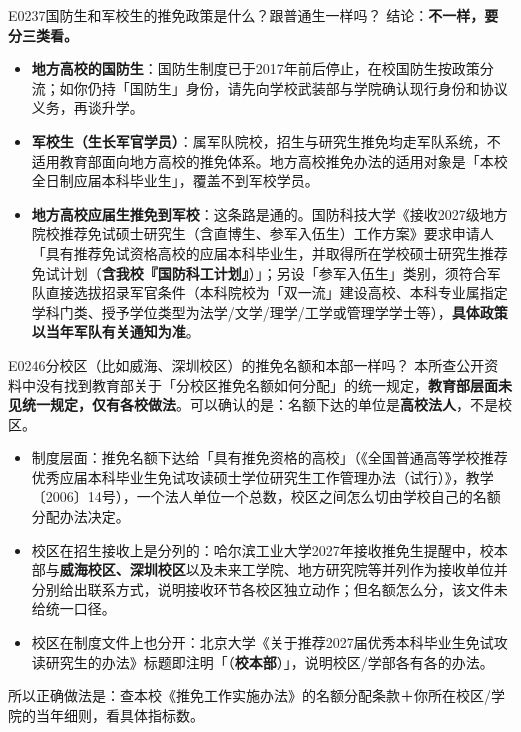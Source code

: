 \begin{qa}{E0237}{国防生和军校生的推免政策是什么？跟普通生一样吗？}
结论：\textbf{不一样，要分三类看。}
\begin{itemize}
  \item \textbf{地方高校的国防生}：国防生制度已于2017年前后停止，在校国防生按政策分流；如你仍持「国防生」身份，请先向学校武装部与学院确认现行身份和协议义务，再谈升学。
  \item \textbf{军校生（生长军官学员）}：属军队院校，招生与研究生推免均走军队系统，不适用教育部面向地方高校的推免体系。地方高校推免办法的适用对象是「本校全日制应届本科毕业生」，覆盖不到军校学员。
  \item \textbf{地方高校应届生推免到军校}：这条路是通的。国防科技大学《接收2027级地方院校推荐免试硕士研究生（含直博生、参军入伍生）工作方案》要求申请人「具有推荐免试资格高校的应届本科毕业生，并取得所在学校硕士研究生推荐免试计划（\textbf{含我校『国防科工计划』}）」；另设「参军入伍生」类别，须符合军队直接选拔招录军官条件（本科院校为「双一流」建设高校、本科专业属指定学科门类、授予学位类型为法学/文学/理学/工学或管理学学士等），\textbf{具体政策以当年军队有关通知为准}。
\end{itemize}
\end{qa}

\begin{qa}{E0246}{分校区（比如威海、深圳校区）的推免名额和本部一样吗？}
本所查公开资料中没有找到教育部关于「分校区推免名额如何分配」的统一规定，\textbf{教育部层面未见统一规定，仅有各校做法}。可以确认的是：名额下达的单位是\textbf{高校法人}，不是校区。
\begin{itemize}
  \item 制度层面：推免名额下达给「具有推免资格的高校」（《全国普通高等学校推荐优秀应届本科毕业生免试攻读硕士学位研究生工作管理办法（试行）》，教学〔2006〕14号），一个法人单位一个总数，校区之间怎么切由学校自己的名额分配办法决定。
  \item 校区在招生接收上是分列的：哈尔滨工业大学2027年接收推免生提醒中，校本部与\textbf{威海校区、深圳校区}以及未来工学院、地方研究院等并列作为接收单位并分别给出联系方式，说明接收环节各校区独立动作；但名额怎么分，该文件未给统一口径。
  \item 校区在制度文件上也分开：北京大学《关于推荐2027届优秀本科毕业生免试攻读研究生的办法》标题即注明「（\textbf{校本部}）」，说明校区/学部各有各的办法。
\end{itemize}
所以正确做法是：查本校《推免工作实施办法》的名额分配条款＋你所在校区/学院的当年细则，看具体指标数。
\end{qa}

